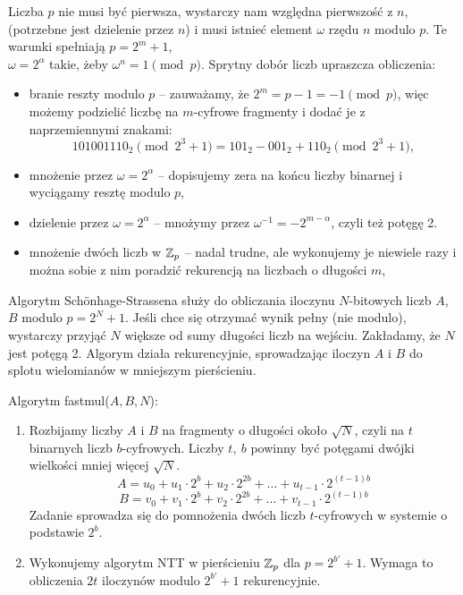 Liczba \( p \) nie musi być pierwsza, wystarczy nam względna pierwszość z \( n \), (potrzebne jest dzielenie przez \( n \)) i musi istnieć element \( \omega \) rzędu \( n \) modulo \( p \).
Te warunki spełniają \( p = 2^m + 1 \), \\ \( \omega = 2^{\alpha} \) takie, żeby \( \omega^n = 1 \pmod{p} \). Sprytny dobór liczb upraszcza obliczenia:
\begin{itemize}
	\item branie reszty modulo \( p \) -- zauważamy, że \( 2^m = p - 1 = -1 \pmod{p} \), więc możemy podzielić liczbę na \( m \)-cyfrowe fragmenty i dodać je z naprzemiennymi znakami:
	      \[
		      101001110_2 \pmod{2^3 + 1} = 101_2 - 001_2 + 110_2 \pmod{2^3 + 1},
	      \]
	\item mnożenie przez \( \omega = 2^{\alpha} \) -- dopisujemy zera na końcu liczby binarnej i wyciągamy resztę modulo \( p \),
	\item dzielenie przez \( \omega = 2^{\alpha} \) -- mnożymy przez \( \omega^{-1} = -2^{m-\alpha} \), czyli też potęgę 2.
	\item mnożenie dwóch liczb w \( \mathbb{Z}_p \) -- nadal trudne, ale wykonujemy je niewiele razy i można sobie z nim poradzić rekurencją na liczbach o długości \( m \),
\end{itemize}

Algorytm Sch{\"o}nhage-Strassena służy do obliczania iloczynu \( N \)-bitowych liczb \( A \), \( B \) modulo \( p = 2^N + 1 \).
Jeśli chce się otrzymać wynik pełny (nie modulo), wystarczy przyjąć \( N \) większe od sumy długości liczb na wejściu. Zakładamy, że \( N \) jest potęgą 2. Algorym działa rekurencyjnie, sprowadzając iloczyn \( A \) i \( B \) do splotu wielomianów w mniejszym pierścieniu.

\begin{greyframe}
	Algorytm fastmul(\( A, B, N \)):
	\begin{enumerate}
		\item Rozbijamy liczby \( A \) i \( B \) na fragmenty o długości około \( \sqrt{N} \), czyli na \( t \) binarnych liczb \( b \)-cyfrowych. Liczby \( t, \ b \) powinny być potęgami dwójki wielkości mniej więcej \( \sqrt{N} \).
		      \[
			      A = u_0 + u_1 \cdot 2^b + u_2 \cdot 2^{2b} + \ldots + u_{t-1} \cdot  2^{(t-1)b}
		      \]
		      \[
			      B = v_0 + v_1 \cdot 2^b + v_2 \cdot 2^{2b} + \ldots + v_{t-1} \cdot 2^{(t-1)b}
		      \]
		      Zadanie sprowadza się do pomnożenia dwóch liczb \( t \)-cyfrowych w systemie o podstawie \( 2^b \).

		\item Wykonujemy algorytm NTT w pierścieniu \( \mathbb{Z}_p \) dla \( p = 2^{b'} + 1 \). Wymaga to obliczenia \( 2t \) iloczynów modulo \( 2^{b'} + 1 \) rekurencyjnie.
	\end{enumerate}
\end{greyframe}

